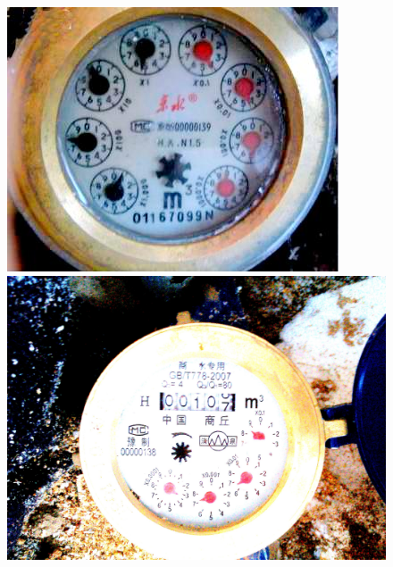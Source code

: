 \documentclass[a4paper]{ctexart}
\begin{document}
\begin{figure}[htbp]
	\centering
	\begin{minipage}[t]{0.25\textwidth}
		\centering
		\includegraphics[width=\textwidth]{figure/msrcr/img1.jpg}
	\end{minipage}
	\begin{minipage}[t]{0.25\textwidth}
		\centering
		\includegraphics[width=\textwidth]{figure/msrcr/img2.jpg}
	\end{minipage}\\
	\begin{minipage}[t]{0.25\textwidth}
		\centering

\end{minipage}
\end{figure}
\end{document}
